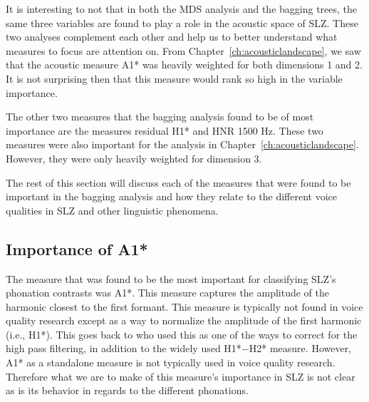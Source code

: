 It is interesting to not that in both the MDS analysis and the bagging trees, the same three variables are found to play a role in the acoustic space of SLZ. These two analyses complement each other and help us to better understand what measures to focus are attention on. From Chapter~\ref{ch:acousticlandscape}, we saw that the acoustic measure A1* was heavily weighted for both dimensions 1 and 2. It is not surprising then that this measure would rank so high in the variable importance.

The other two measures that the bagging analysis found to be of most importance are the measures residual H1* and HNR 1500 Hz. These two measures were also important for the analysis in Chapter~\ref{ch:acousticlandscape}. However, they were only heavily weighted for dimension 3. 

The rest of this section will discuss each of the measures that were found to be important in the bagging analysis and how they relate to the different voice qualities in SLZ and other linguistic phenomena. 

\subsection{Importance of A1*} \label{sec:bagging_a1}

The measure that was found to be the most important for classifying SLZ's phonation contrasts was A1*. This measure captures the amplitude of the harmonic closest to the first formant. This measure is typically not found in voice quality research except as a way to normalize the amplitude of the first harmonic (i.e., H1*). This goes back to \citet{fischer-jorgensenPhoneticAnalysisBreathy1968} who used this as one of the ways to correct for the high pass filtering, in addition to the widely used H1*$-$H2* measure. However, A1* as a standalone measure is not typically used in voice quality research. Therefore what we are to make of this measure's importance in SLZ is not clear as is its behavior in regards to the different phonations. 

